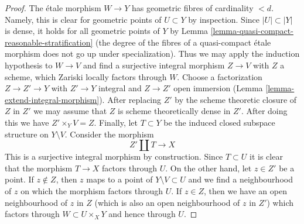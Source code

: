 \documentclass{stacks-project}
\theoremstyle{plain}
\theoremstyle{definition}
\theoremstyle{remark}
\numberwithin{equation}{subsection}
\begin{document}
\begin{proof}
\medskip\noindent
The \'etale morphism $W \to Y$ has geometric fibres of cardinality $< d$.
Namely, this is clear for geometric points of $U \subset Y$ by inspection.
Since $|U| \subset |Y|$ is dense, it holds for all geometric points of $Y$
by Lemma \ref{lemma-quasi-compact-reasonable-stratification}
(the degree of the fibres of a quasi-compact \'etale morphism
does not go up under specialization). Thus we may apply the induction
hypothesis to $W \to V$ and find a surjective integral morphism
$Z \to V$ with $Z$ a scheme, which Zariski locally factors through $W$.
Choose a factorization $Z \to Z' \to Y$ with $Z' \to Y$ integral and
$Z \to Z'$ open immersion
(Lemma \ref{lemma-extend-integral-morphism}).
After replacing $Z'$ by the scheme theoretic closure of $Z$ in $Z'$
we may assume that $Z$ is scheme theoretically dense in $Z'$.
After doing this we have $Z' \times_Y V = Z$. Finally,
let $T \subset Y$ be the induced closed subspace structure on $Y \setminus V$.
Consider the morphism
$$
Z' \amalg T \longrightarrow X
$$
This is a surjective integral morphism by construction.
Since $T \subset U$ it is clear that the morphism $T \to X$
factors through $U$. On the other hand, let $z \in Z'$
be a point. If $z \not \in Z$, then $z$ maps to a point of
$Y \setminus V \subset U$ and we find a neighbourhood of $z$
on which the morphism factors through $U$.
If $z \in Z$, then we have an open neighbourhood of $z$ in $Z$
(which is also an open neighbourhood of $z$ in $Z'$)
which factors through $W \subset U \times_X Y$ and hence through $U$.
\end{proof}
\end{document}
